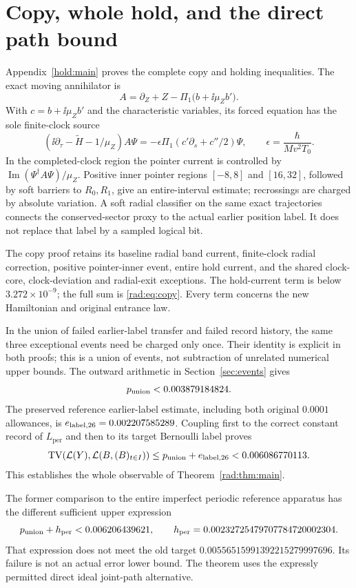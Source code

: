 \documentclass[11pt]{article}
\theoremstyle{definition}\newtheorem{definition}[theorem]{Definition}
\theoremstyle{remark}\newtheorem{remark}[theorem]{Remark}
\newcommand{\TV}{\operatorname{TV}}\newcommand{\Var}{\operatorname{Var}}
\begin{document}
\section{Copy, whole hold, and the direct path bound}

Appendix~\ref{hold:main} proves the complete copy and holding inequalities.
The exact moving annihilator is
\[
 A=\partial_Z+Z-\Pi_1\bigl(b+\ii\mu_Zb'\bigr).
\]
With $c=b+\ii\mu_Zb'$ and the characteristic variables, its forced
equation has the sole finite-clock source
\[
 (\ii\partial_\tau-\widetilde H-1/\mu_Z)A\Psi
 =-\epsilon\Pi_1(c'\partial_s+c''/2)\Psi,
 \qquad \epsilon=\frac{\hbar}{Mv^2T_0}.
\]
In the completed-clock region the pointer current is controlled by
$\operatorname{Im}(\Psi^\dagger A\Psi)/\mu_Z$. Positive inner pointer
regions $[-8,8]$ and $[16,32]$, followed by soft barriers to $R_0,R_1$,
give an entire-interval estimate; recrossings are charged by absolute
variation. A soft radial classifier on the same exact trajectories
connects the conserved-sector proxy to the actual earlier position label.
It does not replace that label by a sampled logical bit.

The copy proof retains its baseline radial band current, finite-clock
radial correction, positive pointer-inner event, entire hold current,
and the shared clock-core, clock-deviation and radial-exit exceptions.
The hold-current term is below $3.272\times10^{-9}$; the full sum is
\eqref{rad:eq:copy}. Every term concerns the new Hamiltonian and original
entrance law.

In the union of failed earlier-label transfer and failed record history,
the same three exceptional events need be charged only once. Their
identity is explicit in both proofs; this is a union of events, not
subtraction of unrelated numerical upper bounds. The outward arithmetic in Section~\ref{sec:events} gives
\[
 p_{\rm union}<0.003879184824.
\]
The preserved reference earlier-label estimate, including both original
$0.0001$ allowances, is
$e_{\rm label,26}=0.002207585289$. Coupling first to the correct constant
record of $L_{\mathrm{per}}$ and then to its target Bernoulli label proves
\[
 \TV(\mathcal L(Y),\mathcal L(B,(B)_{t\in I}))
 \leq p_{\rm union}+e_{\rm label,26}<0.006086770113.
\]
This establishes the whole observable of Theorem~\ref{rad:thm:main}.

The former comparison to the entire imperfect periodic reference apparatus has the
different sufficient upper expression
\[
 p_{\rm union}+h_{\mathrm{per}}<0.006206439621,\qquad
 h_{\mathrm{per}}=0.00232725479707784720002304.
\]
That expression does not meet the old target
$0.00556515991392215279997696$. Its failure is not an actual error lower
bound. The theorem uses the expressly permitted direct ideal joint-path
alternative.
\end{document}
